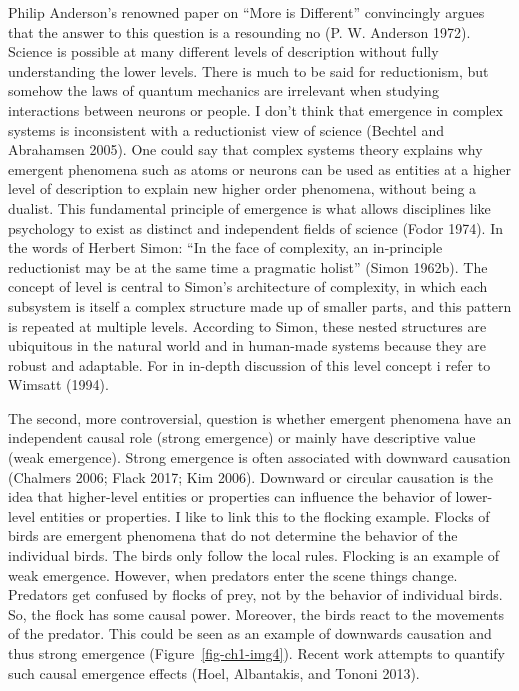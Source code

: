 \documentclass[
  a4paper,
  DIV=11,
  numbers=noendperiod]{scrreprt}
\begin{document}
Philip Anderson's renowned paper on ``More is Different'' convincingly
argues that the answer to this question is a resounding no (P. W.
Anderson 1972). Science is possible at many different levels of
description without fully understanding the lower levels. There is much
to be said for reductionism, but somehow the laws of quantum mechanics
are irrelevant when studying interactions between neurons or people. I
don't think that emergence in complex systems is inconsistent with a
reductionist view of science (Bechtel and Abrahamsen 2005). One could
say that complex systems theory explains why emergent phenomena such as
atoms or neurons can be used as entities at a higher level of
description to explain new higher order phenomena, without being a
dualist. This fundamental principle of emergence is what allows
disciplines like psychology to exist as distinct and independent fields
of science (Fodor 1974). In the words of Herbert Simon: ``In the face of
complexity, an in-principle reductionist may be at the same time a
pragmatic holist'' (Simon 1962b). The concept of level is central to
Simon's architecture of complexity, in which each subsystem is itself a
complex structure made up of smaller parts, and this pattern is repeated
at multiple levels. According to Simon, these nested structures are
ubiquitous in the natural world and in human-made systems because they
are robust and adaptable. For in in-depth discussion of this level
concept i refer to Wimsatt (1994).

The second, more controversial, question is whether emergent phenomena
have an independent causal role (strong emergence) or mainly have
descriptive value (weak emergence). Strong emergence is often associated
with downward causation (Chalmers 2006; Flack 2017; Kim 2006). Downward
or circular causation is the idea that higher-level entities or
properties can influence the behavior of lower-level entities or
properties. I like to link this to the flocking example. Flocks of birds
are emergent phenomena that do not determine the behavior of the
individual birds. The birds only follow the local rules. Flocking is an
example of weak emergence. However, when predators enter the scene
things change. Predators get confused by flocks of prey, not by the
behavior of individual birds. So, the flock has some causal power.
Moreover, the birds react to the movements of the predator. This could
be seen as an example of downwards causation and thus strong emergence
(Figure~\ref{fig-ch1-img4}). Recent work attempts to quantify such
causal emergence effects (Hoel, Albantakis, and Tononi 2013).
\end{document}
